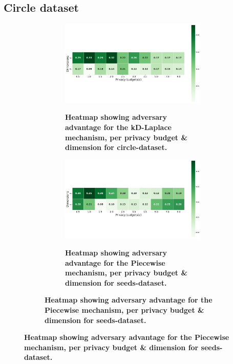 {\subsection{Circle dataset}
\begin{figure}[H]
  \centering
  \begin{subfigure}[b]{0.85\textwidth}
    \begin{subfigure}[c]{1\textwidth}
      \caption{\textbf{Heatmap showing adversary advantage for the kD-Laplace mechanism, per privacy budget \& dimension for circle-dataset.}}
      \includegraphics[width=1\textwidth]{Results/nd-laplace/nd-Laplace/circle-dataset/shokri_mi_adv.png}
      \label{fig:privacy_circle-dataset_adversial_advantage_kd-laplace}
    \end{subfigure}
    \vfill %

    \begin{subfigure}[c]{1\textwidth}
      \caption{\textbf{Heatmap showing adversary advantage for the Piecewise mechanism, per privacy budget \& dimension for seeds-dataset.}}
      \includegraphics[width=1\textwidth]{Results/nd-laplace/piecewise/circle-dataset/shokri_mi_adv.png}
      \label{fig:privacy_circle-dataset_adversial_advantage_piecewise}
    \end{subfigure}
  \end{subfigure}
\end{figure}

}
